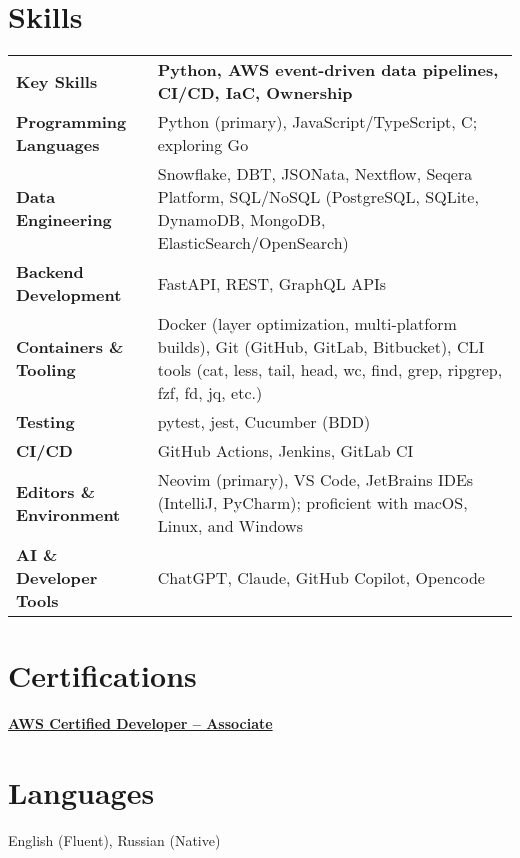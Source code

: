 \documentclass[a4paper,12pt]{article}
\begin{document}
\section{Skills}
\begin{tabularx}{\linewidth}{@{}l X@{}}
\textbf{Key Skills} & \textbf{Python, AWS event-driven data pipelines, CI/CD, IaC, Ownership} \\

\textbf{Programming Languages} & Python (primary), JavaScript/TypeScript, C; exploring Go \\

\textbf{Data Engineering} & Snowflake, DBT, JSONata, Nextflow, Seqera Platform, SQL/NoSQL (PostgreSQL, SQLite, DynamoDB, MongoDB, ElasticSearch/OpenSearch) \\

\textbf{Backend Development} & FastAPI, REST, GraphQL APIs \\

\textbf{Containers \& Tooling} & Docker (layer optimization, multi-platform builds), Git (GitHub, GitLab, Bitbucket), CLI tools (cat, less, tail, head, wc, find, grep, ripgrep, fzf, fd, jq, etc.) \\

\textbf{Testing} & pytest, jest, Cucumber (BDD) \\

\textbf{CI/CD} & GitHub Actions, Jenkins, GitLab CI \\

\textbf{Editors \& Environment} & Neovim (primary), VS Code, JetBrains IDEs (IntelliJ, PyCharm); proficient with macOS, Linux, and Windows \\

\textbf{AI \& Developer Tools} & ChatGPT, Claude, GitHub Copilot, Opencode \\
\end{tabularx}

\section{Certifications}
\href{https://www.credly.com/badges/d8a052d1-eca4-4bbb-ad85-b73be14ee3b2/public_url}{\textbf{AWS Certified Developer – Associate}}

\section{Languages}
English (Fluent), Russian (Native)

\vfill
{}
\end{document}
